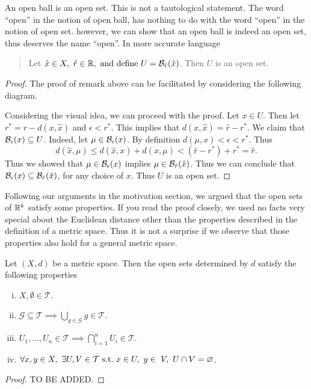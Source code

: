 \begin{remark}
	An open ball is an open set. This is not a tautological statement. The word ``open'' in the notion of open ball, has nothing to do with the word ``open'' in the notion of open set. however, we can show that an open ball is indeed an open set, thus deserves the name ``open''. In more accurate language 
	\begin{quote}
		Let $\hat{x}\in X,\ \hat{r}\in\R,\ \text{and define } U=\ball{\hat{r}}{\hat{x}}$. Then $U$ is an open set.
	\end{quote}
\end{remark}
\begin{proof}
	The proof of remark above can be facilitated by considering the following diagram.

	
	
	Considering the visual idea, we can proceed with the proof. Let $x\in U$. Then let $r^* = r - d(x,\hat{x})$ and $\epsilon < r^*$. This implies that $d(x,\hat{x})=\hat{r}-r^*$. We claim that $\mathcal{B}_{\epsilon}(x) \subseteq U$. Indeed, let $\mu \in \mathcal{B}_{\epsilon}(x) $. By definition $d(\mu,x)<\epsilon<r^*$. Thus
	\[ d(\hat{x},\mu) \leq d(\hat{x},x) + d(x,\mu) < (\hat{r}-r^*) + r^* = \hat{r}. \]
	Thus we showed that $\mu \in \mathcal{B}_{\epsilon}(x)$ implies $\mu \in \mathcal{B}_{\hat{r}}(\hat{x})$. Thus we can conclude that $\mathcal{B}_{\epsilon}(x) \subseteq \mathcal{B}_{\hat{r}}(\hat{x})$, for any choice of $x$. Thus $U$ is an open set. 
\end{proof}

Following our arguments in the motivation section, we argued that the open sets of $\mathbb{R}^k$ satisfy some properties. If you read the proof closely, we used no facts very special about the Euclidean distance other than the properties described in the definition of a metric space. Thus it is not a surprise if we observe that those properties also hold for a general metric space. 

\begin{proposition}
	Let $(X,d)$ be a metric space. Then the open sets determined by $d$ satisfy the following properties
	\begin{enumerate}[(i)]
		\item $X,\emptyset \in \mathcal{T}$.
		\item $\mathcal{G}\subseteq \mathcal{T} \implies \bigcup_{g\in\mathcal{G}} g \in \mathcal{T}$.
		\item $U_1,\hdots,U_n \in \mathcal{T} \implies \bigcap_{i=1}^{n}U_i \in \mathcal{T}$.
		\item $\forall x,y\in X,\ \exists U,V \in \mathcal{T} \ \text{s.t.}\  x\in U,\ y\in\ V,\ U\cap V = \varnothing$.
	\end{enumerate}
\end{proposition}
\begin{proof}
	TO BE ADDED.
\end{proof}


